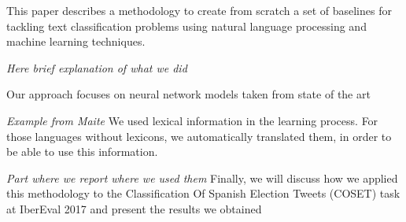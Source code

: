 \abstract

This paper describes a methodology to create from scratch a set of baselines for tackling text classification problems using natural language processing and machine learning techniques.

\emph{Here brief explanation of what we did}

Our approach focuses on neural network models taken from state of the art 

\emph{Example from Maite}
We used lexical information in the learning process. For those languages without lexicons, we automatically translated them, in order to be able to use this information. 

\emph{Part where we report where we used them}
Finally, we will discuss how we applied this methodology to the  Classification Of Spanish Election Tweets (COSET) task at IberEval 2017 and present the results we obtained